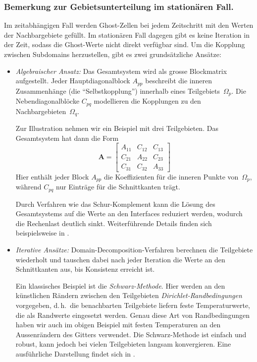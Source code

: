 \subsubsection*{Bemerkung zur Gebietsunterteilung im stationären Fall.}  
Im zeitabhängigen Fall werden Ghost-Zellen bei jedem Zeitschritt mit den Werten der Nachbargebiete gefüllt.  
Im stationären Fall dagegen gibt es keine Iteration in der Zeit, sodass die Ghost-Werte nicht direkt verfügbar sind.  
Um die Kopplung zwischen Subdomains herzustellen, gibt es zwei grundsätzliche Ansätze:

\begin{itemize}
	\item \emph{Algebraischer Ansatz:}  
	Das Gesamtsystem wird als grosse Blockmatrix aufgestellt.  
%
	Jeder Hauptdiagonalblock \(A_{pp}\) beschreibt die inneren Zusammenhänge (die ``Selbstkopplung'') innerhalb eines Teilgebiets~\(\Omega_p\).  
%
%
	Die Nebendiagonalblöcke \(C_{pq}\) modellieren die Kopplungen zu den Nachbargebieten~\(\Omega_q\).  
	
	Zur Illustration nehmen wir ein Beispiel mit drei Teilgebieten.  
	Das Gesamtsystem hat dann die Form
	\[
	\boldsymbol{A} =
	\begin{bmatrix}
		A_{11} & C_{12} & C_{13} \\
		C_{21} & A_{22} & C_{23} \\
		C_{31} & C_{32} & A_{33}
	\end{bmatrix}
	\]
	Hier enthält jeder Block \(A_{pp}\) die Koeffizienten für die inneren Punkte von~\(\Omega_p\), 
	während \(C_{pq}\) nur Einträge für die Schnittkanten trägt.  
	
	Durch Verfahren wie das Schur-Komplement kann die Lösung des Gesamtsystems auf die Werte an den Interfaces reduziert werden, 
%
	wodurch die Rechenlast deutlich sinkt.  
	Weiterführende Details finden sich beispielsweise in \cite{parallelisierung:smith1996}.
	
	\item \emph{Iterative Ansätze:}  
	Domain-Decomposition-Verfahren berechnen die Teilgebiete wiederholt und tauschen dabei nach jeder Iteration die Werte an den Schnittkanten aus, bis Konsistenz erreicht ist.  
	
	Ein klassisches Beispiel ist die \emph{Schwarz-Methode}.  
%
	Hier werden an den künstlichen Rändern zwischen den Teilgebieten \emph{Dirichlet-Randbedingungen} vorgegeben, d.\,h.\ die benachbarten Teilgebiete liefern feste Temperaturwerte, die als Randwerte eingesetzt werden.  
%
	Genau diese Art von Randbedingungen haben wir auch im obigen Beispiel mit festen Temperaturen an den Aussenrändern des Gitters verwendet.  
	Die Schwarz-Methode ist einfach und robust, kann jedoch bei vielen Teilgebieten langsam konvergieren.  
	Eine ausführliche Darstellung findet sich in \cite{parallelisierung:quarteroniValli1999}.  
	

\end{itemize}
